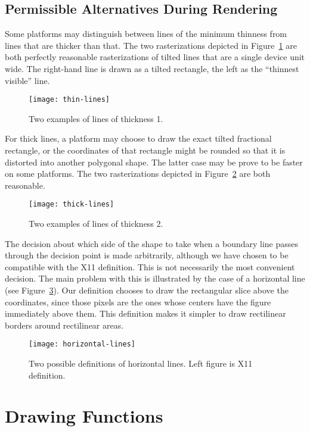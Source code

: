 \subsection {Permissible Alternatives During Rendering}

Some platforms may distinguish between lines of the minimum thinness from lines
that are thicker than that.  The two rasterizations depicted in
Figure~\ref{thin-lines} are both perfectly reasonable rasterizations of tilted
lines that are a single device unit wide.  The right-hand line is drawn as a
tilted rectangle, the left as the ``thinnest visible'' line.

\begin{figure}
\centerline{\texttt{[image: thin-lines]}}
\caption{\label{thin-lines} Two examples of lines of thickness 1.}
\end{figure}

For thick lines, a platform may choose to draw the exact tilted fractional
rectangle, or the coordinates of that rectangle might be rounded so that it is
distorted into another polygonal shape.  The latter case may be prove to be
faster on some platforms.  The two rasterizations depicted in
Figure~\ref{thick-lines} are both reasonable.

\begin{figure}
\centerline{\texttt{[image: thick-lines]}}
\caption{\label{thick-lines} Two examples of lines of thickness 2.}
\end{figure}

The decision about which side of the shape to take when a boundary line passes
through the decision point is made arbitrarily, although we have chosen to be
compatible with the X11 definition.  This is not necessarily the most convenient
decision.  The main problem with this is illustrated by the case of a horizontal
line (see Figure~\ref{horizontal-lines}).  Our definition chooses to draw the
rectangular slice above the coordinates, since those pixels are the ones whose
centers have the figure immediately above them.  This definition makes it
simpler to draw rectilinear borders around rectilinear areas.

\begin{figure}
\centerline{\texttt{[image: horizontal-lines]}}
\caption{\label{horizontal-lines} Two possible definitions of horizontal lines. 
Left figure is X11 definition.}
\end{figure}


\section {Drawing Functions\label{drawing-functions}}

